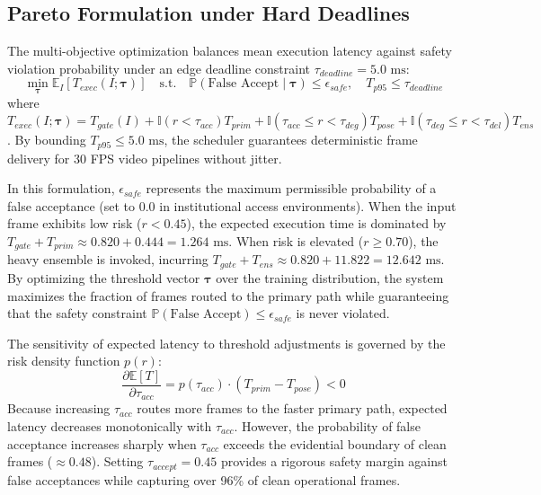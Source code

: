 \documentclass[conference]{IEEEtran}
\begin{document}
\subsection{Pareto Formulation under Hard Deadlines}
The multi-objective optimization balances mean execution latency against safety violation probability under an edge deadline constraint $\tau_{deadline} = 5.0\text{ ms}$:
\begin{equation}
\min_{\boldsymbol{\tau}} \mathbb{E}_{I}[T_{exec}(I; \boldsymbol{\tau})] \quad \text{s.t.} \quad \mathbb{P}(\text{False Accept} \mid \boldsymbol{\tau}) \le \epsilon_{safe}, \quad T_{p95} \le \tau_{deadline}
\end{equation}
where $T_{exec}(I; \boldsymbol{\tau}) = T_{gate}(I) + \mathbb{I}(r < \tau_{acc}) T_{prim} + \mathbb{I}(\tau_{acc} \le r < \tau_{deg}) T_{pose} + \mathbb{I}(\tau_{deg} \le r < \tau_{del}) T_{ens}$. By bounding $T_{p95} \le 5.0\text{ ms}$, the scheduler guarantees deterministic frame delivery for 30 FPS video pipelines without jitter.

In this formulation, $\epsilon_{safe}$ represents the maximum permissible probability of a false acceptance (set to 0.0 in institutional access environments). When the input frame exhibits low risk ($r < 0.45$), the expected execution time is dominated by $T_{gate} + T_{prim} \approx 0.820 + 0.444 = 1.264\text{ ms}$. When risk is elevated ($r \ge 0.70$), the heavy ensemble is invoked, incurring $T_{gate} + T_{ens} \approx 0.820 + 11.822 = 12.642\text{ ms}$. By optimizing the threshold vector $\boldsymbol{\tau}$ over the training distribution, the system maximizes the fraction of frames routed to the primary path while guaranteeing that the safety constraint $\mathbb{P}(\text{False Accept}) \le \epsilon_{safe}$ is never violated.

The sensitivity of expected latency to threshold adjustments is governed by the risk density function $p(r)$:
\begin{equation}
\frac{\partial \mathbb{E}[T]}{\partial \tau_{acc}} = p(\tau_{acc}) \cdot (T_{prim} - T_{pose}) < 0
\end{equation}
Because increasing $\tau_{acc}$ routes more frames to the faster primary path, expected latency decreases monotonically with $\tau_{acc}$. However, the probability of false acceptance increases sharply when $\tau_{acc}$ exceeds the evidential boundary of clean frames ($\approx 0.48$). Setting $\tau_{accept} = 0.45$ provides a rigorous safety margin against false acceptances while capturing over 96\% of clean operational frames.
\end{document}

